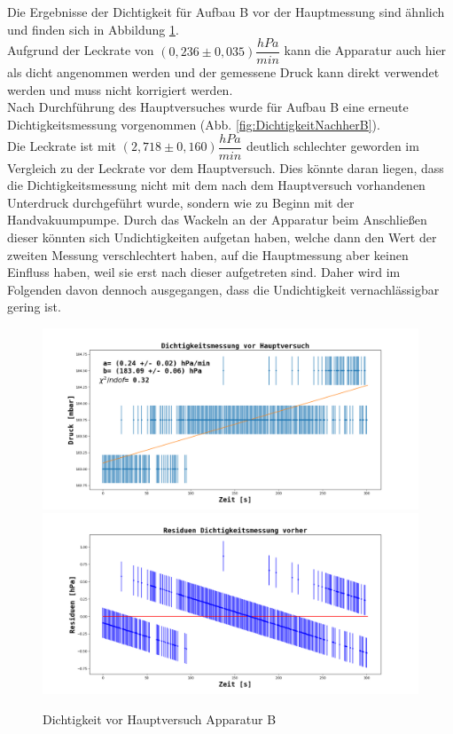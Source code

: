 \documentclass[12pt,a4paper]{article}
\begin{document}
Die Ergebnisse der Dichtigkeit für Aufbau B vor der Hauptmessung sind ähnlich und finden sich in Abbildung \ref{fig:DichtigkeitB}.\\
Aufgrund der Leckrate von $(0,236 \pm 0,035) \dfrac{hPa}{min}$ kann die Apparatur auch hier als dicht angenommen werden und der gemessene Druck kann direkt verwendet werden und muss nicht korrigiert werden.\\
Nach Durchführung des Hauptversuches wurde für Aufbau B eine erneute Dichtigkeitsmessung vorgenommen (Abb. \ref{fig:DichtigkeitNachherB}).\\
Die Leckrate ist mit $(2,718 \pm 0,160) \dfrac{hPa}{min}$ deutlich schlechter geworden im Vergleich zu der Leckrate vor dem Hauptversuch. Dies könnte daran liegen, dass die Dichtigkeitsmessung nicht mit dem nach dem Hauptversuch vorhandenen Unterdruck durchgeführt wurde, sondern wie zu Beginn mit der Handvakuumpumpe. Durch das Wackeln an der Apparatur beim Anschließen dieser könnten sich Undichtigkeiten aufgetan haben, welche dann den Wert der zweiten Messung verschlechtert haben, auf die Hauptmessung aber keinen Einfluss haben, weil sie erst nach dieser aufgetreten sind. Daher wird im Folgenden davon dennoch ausgegangen, dass die Undichtigkeit vernachlässigbar gering ist.


\begin{figure}
\centering
\includegraphics[width=\linewidth]{Bilder/Dichtigkeit_vorher_B.png}
\includegraphics[width=\linewidth]{Bilder/Residuen_Dichtigkeit_vorher_B.png}
\caption[Dichtigkeit vor Hauptversuch Apparatur B]{Dichtigkeit vor Hauptversuch Apparatur B}
\label{fig:DichtigkeitB}
\end{figure}
\end{document}
